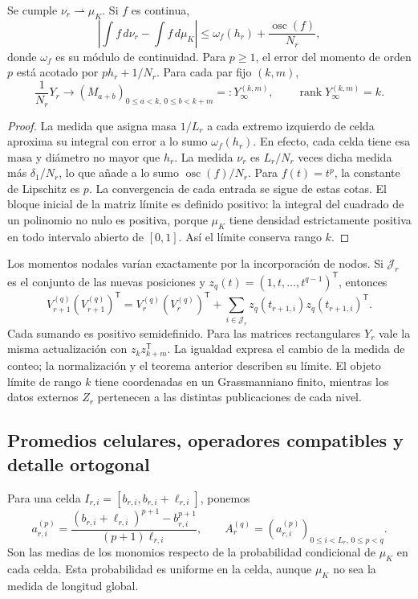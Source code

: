 \begin{theorem}
\label{thm:dim-nodal-limit}
Se cumple \(\nu_r\rightharpoonup\mu_K\). Si \(f\) es continua,
\[
 \left|\int f\,d\nu_r-\int f\,d\mu_K\right|
 \leq \omega_f(h_r)+\frac{\operatorname{osc}(f)}{N_r},
\]
donde \(\omega_f\) es su módulo de continuidad. Para \(p\geq1\),
el error del momento de orden \(p\) está acotado por
\(p h_r+1/N_r\). Para cada par fijo \((k,m)\),
\[
 \frac1{N_r}Y_r\longrightarrow (M_{a+b})_{
     0\leq a<k,\,0\leq b<k+m}=:Y_\infty^{(k,m)},
 \qquad\operatorname{rank}Y_\infty^{(k,m)}=k.
\]
\end{theorem}
\begin{proof}
La medida que asigna masa \(1/L_r\) a cada extremo izquierdo de
celda aproxima su integral con error a lo sumo \(\omega_f(h_r)\).
En efecto, cada celda tiene esa masa y diámetro no mayor que \(h_r\).
La medida \(\nu_r\) es \(L_r/N_r\) veces dicha medida más
\(\delta_1/N_r\), lo que añade a lo sumo
\(\operatorname{osc}(f)/N_r\). Para \(f(t)=t^p\), la constante
de Lipschitz es \(p\). La convergencia de cada entrada se sigue de
estas cotas. El bloque inicial de la matriz límite es definido positivo:
la integral del cuadrado de un polinomio no nulo es positiva, porque
\(\mu_K\) tiene densidad estrictamente positiva en todo intervalo
abierto de \([0,1]\). Así el límite conserva rango \(k\).
\end{proof}

Los momentos nodales varían exactamente por la incorporación de nodos.
Si \(\mathcal J_r\) es el conjunto de las nuevas posiciones y
\(z_q(t)=(1,t,\ldots,t^{q-1})^{\mathsf T}\), entonces
\[
 V_{r+1}^{(q)}(V_{r+1}^{(q)})^{\mathsf T}
 =V_r^{(q)}(V_r^{(q)})^{\mathsf T}
  +\sum_{i\in\mathcal J_r}z_q(t_{r+1,i})z_q(t_{r+1,i})^{\mathsf T}.
\]
Cada sumando es positivo semidefinido. Para las matrices rectangulares
\(Y_r\) vale la misma actualización con
\(z_kz_{k+m}^{\mathsf T}\). La igualdad expresa el cambio de la
medida de conteo; la normalización y el teorema anterior describen su
límite. El objeto límite de rango \(k\) tiene coordenadas en un
Grassmanniano finito, mientras los datos externos \(Z_r\) pertenecen
a las distintas publicaciones de cada nivel.

\subsection{Promedios celulares, operadores compatibles y detalle ortogonal}

Para una celda \(I_{r,i}=[b_{r,i},b_{r,i}+\ell_{r,i}]\), ponemos
\[
 a_{r,i}^{(p)}=
 \frac{(b_{r,i}+\ell_{r,i})^{p+1}-b_{r,i}^{p+1}}
 {(p+1)\ell_{r,i}},\qquad
 A_r^{(q)}=(a_{r,i}^{(p)})_{0\leq i<L_r,\,0\leq p<q}.
\]
Son las medias de los monomios respecto de la probabilidad condicional
de \(\mu_K\) en cada celda. Esta probabilidad es uniforme en la
celda, aunque \(\mu_K\) no sea la medida de longitud global.

